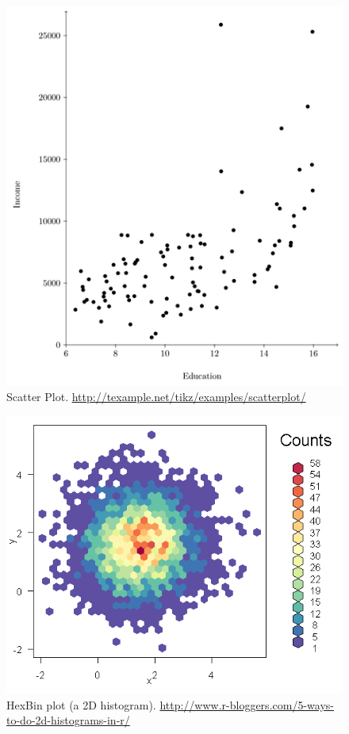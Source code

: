 \documentclass[12pt,a4paper]{report}
\theoremstyle{plain}
\theoremstyle{definition}
\begin{document}
\begin{figure}[h]
\centering
\includegraphics[height=0.3\textheight]{art/scatterplot}
\caption[Scatter Plot]{Scatter Plot. \newline 
\url{http://texample.net/tikz/examples/scatterplot/}}
\label{fig:scatterplot}
\end{figure}





\begin{figure}[h]
\centering
\includegraphics[height=0.3\textheight]{art/hexbin2}
\caption[HexBin Plot]{HexBin plot (a 2D histogram).
\newline \url{http://www.r-bloggers.com/5-ways-to-do-2d-histograms-in-r/}}
\label{fig:hexbin}
\end{figure}
\end{document}

